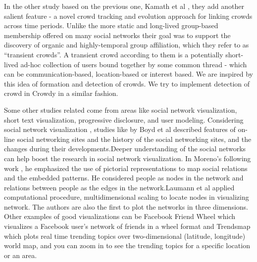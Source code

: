 \documentclass{sig-alternate}
\begin{document}
In the other study based on the previous one, Kamath et al
\cite{krishna:2011}, they add another salient feature - a novel crowd tracking
and evolution approach for linking crowds across time periods. Unlike the more
static and long-lived group-based membership offered on many social networks
their goal was to support the discovery of organic and highly-temporal group
affiliation, which they refer to as ``transient crowds''. A transient crowd
according to them is a potentially short-lived ad-hoc collection of users bound
together by some common thread - which can be communication-based,
location-based or interest based. We are inspired by this idea of formation and
detection of crowds. We try to implement detection of crowd in Crowdy in a
similar fashion.

Some other studies related come from areas like social network visualization,
short text visualization, progressive disclosure, and user modeling. Considering
social network visualization , studies like \cite{Boyd:2008} by Boyd et al described features
of on-line social networking sites and the history of the social networking sites,
and the changes during their developments.Deeper understanding of the social
networks can help boost the research in social network visualization. In Moreno's
following work \cite{Moreno:1953}, he emphasized the use of pictorial representations to map
social relations and the embedded patterns. He considered people as nodes in the
network and relations between people as the edges in the network.Laumann et al
\cite{Laumann:1966} applied computational procedure, multidimensional scaling to locate nodes in
visualizing network. The authors are also the first to plot the networks in three
dimensions. Other examples of good visualizations can be Facebook Friend Wheel
\cite{facebook_wheel} which visualizes a Facebook user's network of friends in a wheel format and
Trendsmap \cite{trends_map} which plots real time trending topics over two-dimensional (latitude,
longitude) world map, and you can zoom in to see the trending topics for a specific
location or an area. 
\end{document}
